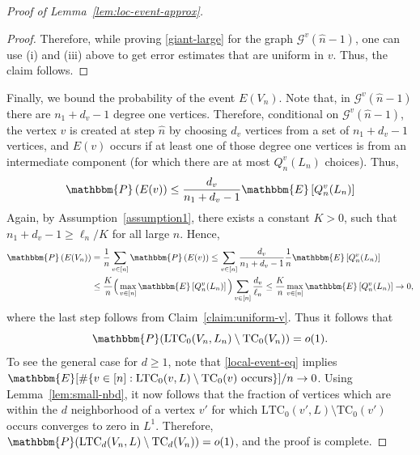\documentclass[11pt,a4paper, reqno]{article}
\numberwithin{equation}{section}
\numberwithin{equation}{section}
\newcommand{\prob}[1]{\ensuremath{\mathbbm{P}\left(#1\right)}}
\newcommand{\expt}[1]{\ensuremath{\mathbbm{E}\left[#1\right]}}
\newcommand{\PR}{\ensuremath{\mathbbm{P}}}
\newcommand{\E}{\ensuremath{\mathbbm{E}}}
\newcommand{\1}{\ensuremath{\mathbbm{1}}}
\newenvironment{claimproof}{\begin{proof}\renewcommand{\qedsymbol}{\claimqed}}{\end{proof}\renewcommand{\qedsymbol}{\plainqed}}
\let\plainqed\qedsymbol
\newcommand{\claimqed}{$\lrcorner$}
\numberwithin{equation}{section}
\numberwithin{theorem}{section}
\begin{document}
\begin{proof}[{Proof of Lemma~\ref{lem:loc-event-approx}}]
\begin{claimproof}
 Therefore, while proving \eqref{giant-large} for the graph $\mathcal{G}^v(\hat{n}-1)$, one can  use (i) and (iii) above to get error estimates that are uniform in $v$. Thus, the claim follows.
\end{claimproof}
\noindent
Finally, we bound the probability of the event $E(V_n)$. 
Note that, 
in $\mathcal{G}^v(\hat{n}-1)$ there are $n_1+d_v-1$ degree one vertices.
Therefore, conditional on $\mathcal{G}^v(\hat{n}-1)$, the vertex $v$ is created at step $\hat{n}$ by choosing $d_v$ vertices from a set of $n_1+d_v-1$ vertices, and $E(v)$ occurs if at least one of those degree one vertices is from an intermediate component (for which there are at most $Q_n^v(L_n)$ choices). Thus,
$$\prob{E(v)} \leq \frac{d_v}{n_1+d_v-1}\expt{Q_n^v(L_n)}$$
%
Again,  by Assumption~\ref{assumption1}, there exists a constant $K>0$, such that $n_1+d_v-1\geq \ell_n/K$ for all large $n$. Hence, 
\begin{equation}
 \begin{split}
  \prob{E(V_n)}&=\frac{1}{n}\sum_{v\in [n]} \prob{E(v)}\leq \sum_{v\in [n]}\frac{d_v}{n_1+d_v-1}\frac{1}{n}\expt{Q_n^v(L_n)}\\
  &\leq  \frac{K}{n}\Big(\max_{v\in [n]}\expt{Q_n^v(L_n)}\Big)\sum_{v\in [n]}\frac{d_v}{\ell_n}
  \leq \frac{K}{n}\max_{v\in [n]}\expt{Q_n^v(L_n)}\to 0,
 \end{split}
\end{equation}
where the last step  follows from Claim~\ref{claim:uniform-v}.
Thus it follows that
\begin{equation}\label{local-event-eq}
\PR(\mathrm{LTC}_0(V_n,L_n)\setminus \mathrm{TC}_0(V_n))=o(1).
\end{equation}
To see the general case for $d\geq 1$, note that \eqref{local-event-eq} implies $\E[\#\{v\in [n]: \mathrm{LTC}_0(v,L)\setminus \mathrm{TC}_0(v) \text{ occurs} \}]/n\to 0$.  Using Lemma~\ref{lem:small-nbd}, it now follows that the fraction of vertices which are within the $d$ neighborhood of a vertex $v'$ for which $\mathrm{LTC}_0(v',L)\setminus \mathrm{TC}_0(v') $ occurs converges to zero in $L^1$. Therefore, $\PR(\mathrm{LTC}_d(V_n,L)\setminus \mathrm{TC}_d(V_n))=o(1)$, and the proof is complete.
\end{proof}
\end{document}
